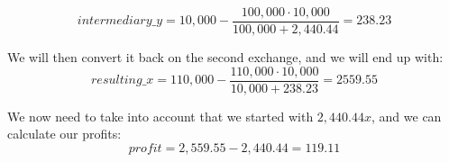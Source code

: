 \begin{equation}
intermediary\_y = 10,000 - \frac{100,000 \cdot 10,000}{100,000 + 2,440.44} = 238.23
\end{equation}

We will then convert it back on the second exchange, and we will end up with:
\begin{equation}
resulting\_x = 110,000 - \frac{110,000 \cdot 10,000}{10,000 + 238.23} = 2559.55
\end{equation}

We now need to take into account that we started with $2,440.44 x$, and we can
calculate our profits:
\begin{equation}
profit = 2,559.55 - 2,440.44 = 119.11
\end{equation}

